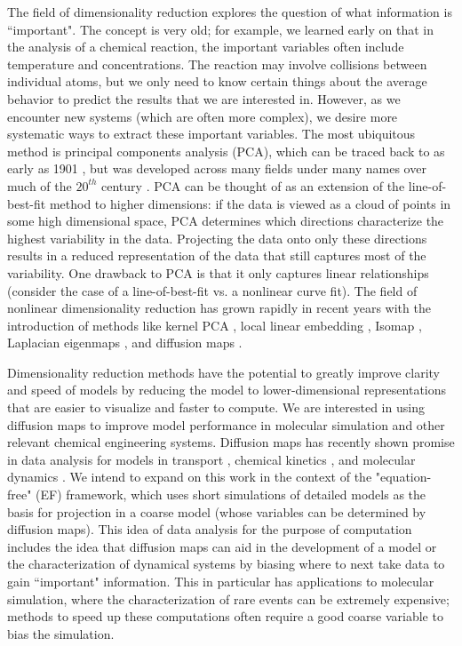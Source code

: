 \documentclass[12pt]{article}
\begin{document}
The field of dimensionality reduction explores the question of what information is ``important". The concept is very old; for example, we learned early on that in the analysis of a chemical reaction, the important variables often include temperature and concentrations. The reaction may involve collisions between individual atoms, but we only need to know certain things about the average behavior to predict the results that we are interested in. However, as we encounter new systems (which are often more complex), we desire more systematic ways to extract these important variables. The most ubiquitous method is principal components analysis (PCA), which can be traced back to as early as 1901 \cite{Pearson1901}, but was developed across many fields under many names over much of the $20^{th}$ century \cite{Hotelling1933, Sirovich1987}. PCA can be thought of as an extension of the line-of-best-fit method to higher dimensions: if the data is viewed as a cloud of points in some high dimensional space, PCA determines which directions characterize the highest variability in the data. Projecting the data onto only these directions results in a reduced representation of the data that still captures most of the variability. One drawback to PCA is that it only captures linear relationships (consider the case of a line-of-best-fit vs. a nonlinear curve fit). The field of nonlinear dimensionality reduction has grown rapidly in recent years with the introduction of methods like kernel PCA \cite{Scholkopf1998}, local linear embedding \cite{Roweis2000}, Isomap \cite{Tenenbaum2000}, Laplacian eigenmaps \cite{Belkin2003}, and diffusion maps \cite{Coifman2005, Coifman2005a, Coifman2006}. \vspace{1mm}

Dimensionality reduction methods have the potential to greatly improve clarity and speed of models by reducing the model to lower-dimensional representations that are easier to visualize and faster to compute. We are interested in using diffusion maps to improve model performance in molecular simulation and other relevant chemical engineering systems. Diffusion maps has recently shown promise in data analysis for models in transport \cite{Sonday2009}, chemical kinetics \cite{Chiavazzo2014}, and molecular dynamics \cite{Ferguson2010} \cite{Ferguson2011} \cite{Nedialkova2014} \cite{Kim2015}. We intend to expand on this work in the context of the "equation-free" (EF) framework, which uses short simulations of detailed models as the basis for projection in a coarse model (whose variables can be determined by diffusion maps). This idea of data analysis for the purpose of computation includes the idea that diffusion maps can aid in the development of a model or the characterization of dynamical systems by biasing where to next take data to gain ``important" information. This in particular has applications to molecular simulation, where the characterization of rare events can be extremely expensive; methods to speed up these computations often require a good coarse variable to bias the simulation.  \vspace{1mm}
\end{document}
